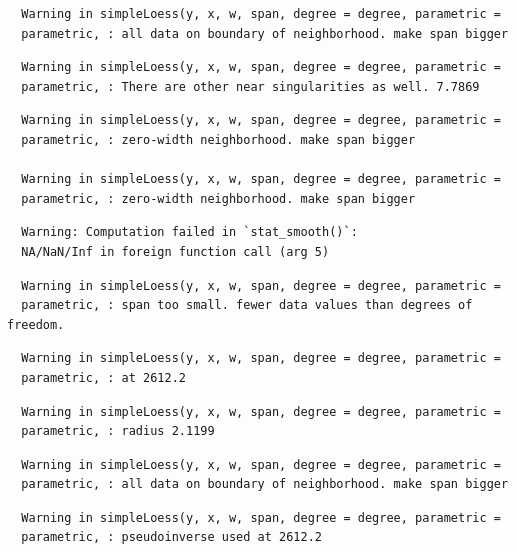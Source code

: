 \documentclass[12pt,twoside]{reedthesis}
\begin{document}
  \begin{verbatim}
  Warning in simpleLoess(y, x, w, span, degree = degree, parametric =
  parametric, : all data on boundary of neighborhood. make span bigger
  \end{verbatim}
  
  \begin{verbatim}
  Warning in simpleLoess(y, x, w, span, degree = degree, parametric =
  parametric, : There are other near singularities as well. 7.7869
  \end{verbatim}
  
  \begin{verbatim}
  Warning in simpleLoess(y, x, w, span, degree = degree, parametric =
  parametric, : zero-width neighborhood. make span bigger
  
  Warning in simpleLoess(y, x, w, span, degree = degree, parametric =
  parametric, : zero-width neighborhood. make span bigger
  \end{verbatim}
  
  \begin{verbatim}
  Warning: Computation failed in `stat_smooth()`:
  NA/NaN/Inf in foreign function call (arg 5)
  \end{verbatim}
  
  \begin{verbatim}
  Warning in simpleLoess(y, x, w, span, degree = degree, parametric =
  parametric, : span too small. fewer data values than degrees of freedom.
  \end{verbatim}
  
  \begin{verbatim}
  Warning in simpleLoess(y, x, w, span, degree = degree, parametric =
  parametric, : at 2612.2
  \end{verbatim}
  
  \begin{verbatim}
  Warning in simpleLoess(y, x, w, span, degree = degree, parametric =
  parametric, : radius 2.1199
  \end{verbatim}
  
  \begin{verbatim}
  Warning in simpleLoess(y, x, w, span, degree = degree, parametric =
  parametric, : all data on boundary of neighborhood. make span bigger
  \end{verbatim}
  
  \begin{verbatim}
  Warning in simpleLoess(y, x, w, span, degree = degree, parametric =
  parametric, : pseudoinverse used at 2612.2
  \end{verbatim}
  
\end{document}
